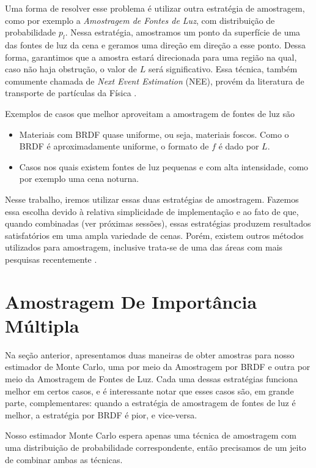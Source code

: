 Uma forma de resolver esse problema é utilizar outra estratégia de amostragem,
como por exemplo a \emph{Amostragem de Fontes de Luz}, com distribuição de
probabilidade $p_l$. Nessa estratégia, amostramos um ponto da superfície de uma
das fontes de luz da cena e geramos uma direção em direção a esse ponto. Dessa
forma, garantimos que a amostra estará direcionada para uma região na qual,
caso não haja obstrução, o valor de $L$ será significativo. Essa técnica,
também comumente chamada de \emph{Next Event Estimation} (NEE), provém da
literatura de transporte de partículas da Física \citep{coveyou67}.

Exemplos de casos que melhor aproveitam a amostragem de fontes de luz são

\begin{itemize}
  \item Materiais com BRDF quase uniforme, ou seja, materiais foscos. Como o
    BRDF é aproximadamente uniforme, o formato de $f$ é dado por $L$.
  \item Casos nos quais existem fontes de luz pequenas e com alta intensidade,
    como por exemplo uma cena noturna.
\end{itemize}

Nesse trabalho, iremos utilizar essas duas estratégias de amostragem. Fazemos
essa escolha devido à relativa simplicidade de implementação e ao fato de que,
quando combinadas (ver próximas sessões), essas estratégias produzem resultados
satisfatórios em uma ampla variedade de cenas. Porém, existem outros métodos
utilizados para amostragem, inclusive trata-se de uma das áreas com mais pesquisas
recentemente \citep{lin22, yan25}. 

\section{Amostragem De Importância Múltipla}
\label{sec:mis}

Na seção anterior, apresentamos duas maneiras de obter amostras para nosso
estimador de Monte Carlo, uma por meio da Amostragem por BRDF e outra por meio
da Amostragem de Fontes de Luz. Cada uma dessas estratégias funciona melhor em
certos casos, e é interessante notar que esses casos são, em grande parte,
complementares: quando a estratégia de amostragem de fontes de luz é melhor, a
estratégia por BRDF é pior, e vice-versa.

Nosso estimador Monte Carlo espera apenas uma técnica de amostragem com uma
distribuição de probabilidade correspondente, então precisamos de um jeito de
combinar ambas as técnicas.

